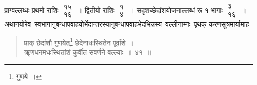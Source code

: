 \documentclass[10pt, openany]{book}
\begin{document}
{प्राग्वल्लब्धः प्रथमो राशिः $\begin{matrix}

\mbox{{१५}}\\

\mbox{{१६}}

\end{matrix}$~। द्वितीयो राशिः $\begin{matrix}

\mbox{{१}}\\

\mbox{{४}}

\end{matrix}$~।
सदृशच्छेदांशयोजनाल्लब्धं रू १ भागाः $\begin{matrix}

\mbox{{३}}\\

\mbox{{१६}}

\end{matrix}$~।}\\

 अथानयोरेव \,स्वभागानुबन्धापवाहयोर्भेदान्तरस्यानुबन्धापवाहभेदभिन्नस्य \,वल्लीनाम्नः \,पृथक् करणसूत्रमार्यामाह\textendash \,

 \label{41}
\begin{quote}
    
{\bs प्राक् छेदांशौ गुणयेत्\renewcommand{\thefootnote}{\s १}\footnote{\s गुणये~।} छेदेनाधःस्थितेन पूर्वांशे~। \\
 ॠणधनमधःस्थितांशं कुर्वीत सवर्णने वल्ल्याः~॥~४१~॥}\end{quote}
\end{document}
